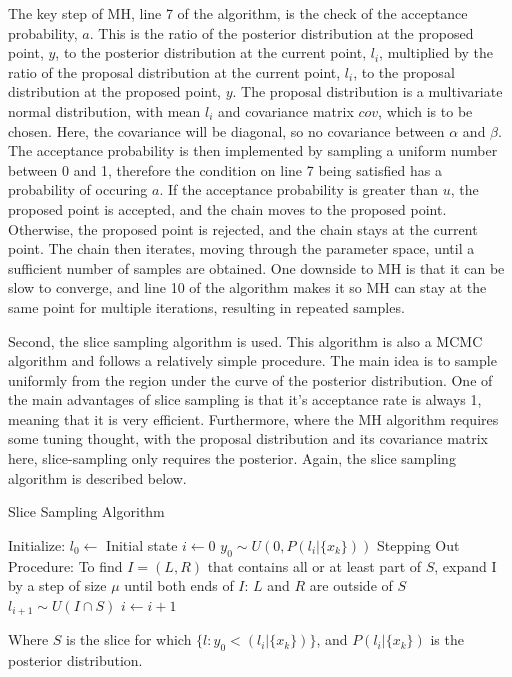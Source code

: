 \documentclass[12pt]{report} %
\begin{document}
\vspace*{1\baselineskip}
The key step of MH, line 7 of the algorithm, is the check of the acceptance probability, $a$. This is the ratio of the posterior distribution at the proposed point, $y$, to the posterior distribution at the current point, $l_{i}$, multiplied by the ratio of the proposal distribution at the current point, $l_{i}$, to the proposal distribution at the proposed point, $y$. The proposal distribution is a multivariate normal distribution, with mean $l_{i}$ and covariance matrix $cov$, which is to be chosen. Here, the covariance will be diagonal, so no covariance between $\alpha$ and $\beta$. The acceptance probability is then implemented by sampling a uniform number between 0 and 1, therefore the condition on line 7 being satisfied has a probability of occuring $a$. If the acceptance probability is greater than $u$, the proposed point is accepted, and the chain moves to the proposed point. Otherwise, the proposed point is rejected, and the chain stays at the current point. The chain then iterates, moving through the parameter space, until a sufficient number of samples are obtained. One downside to MH is that it can be slow to converge\cite{li_monte_carlo}, and line 10 of the algorithm makes it so MH can stay at the same point for multiple iterations, resulting in repeated samples.


Second, the slice sampling algorithm is used. This algorithm is also a MCMC algorithm and follows a relatively simple procedure. The main idea is to sample uniformly from the region under the curve of the posterior distribution. One of the main advantages of slice sampling is that it's acceptance rate is always 1, meaning that it is very efficient. Furthermore, where the MH algorithm requires some tuning thought, with the proposal distribution and its covariance matrix here, slice-sampling only requires the posterior\cite{neal_slice_sampling}. Again, the slice sampling algorithm is described below.\cite{karamanis_zeus}

\begin{definitionbox}{Slice Sampling Algorithm \cite{karamanis_zeus}}
\fontsize{8}{12}\selectfont
    \begin{algorithmic}[1]
        \State Initialize:
        \State \quad $l_0 \gets$ Initial state
        \State \quad $i \gets 0$
         
            \State $y_{0} \sim U(0, P(l_{i}|\{x_{k}\}))$
            \State Stepping Out Procedure: To find $I = (L, R)$ that contains all or at least part of $S$, expand I by a step of size $\mu$ until both ends of $I$: $L$ and $R$ are outside of $S$
            \State $l_{i+1} \sim U(I \cap S)$ 
            \State $i \gets i + 1$
        \EndWhile
    \end{algorithmic}
    Where $S$ is the slice for which $\{l: y_{0} < (l_{i}|\{x_{k}\})\}$, and $P(l_{i}|\{x_{k}\})$ is the posterior distribution.
\end{definitionbox}
\end{document}
